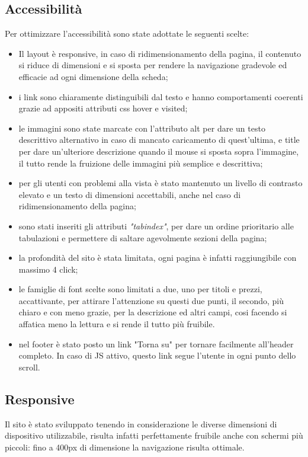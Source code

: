 \subsection{Accessibilità}
Per ottimizzare l'accessibilità sono state adottate le seguenti scelte:
\begin{itemize}
	\item Il layout è responsive, in caso di ridimensionamento della pagina, il contenuto si riduce di dimensioni e si sposta per rendere la navigazione gradevole ed efficacie ad ogni dimensione della scheda;
	\item i link sono chiaramente distinguibili dal testo e hanno comportamenti coerenti grazie ad appositi attributi css hover e visited;
	\item le immagini sono state marcate con l'attributo alt per dare un testo descrittivo alternativo in caso di mancato caricamento di quest'ultima, e title per dare un'ulteriore descrizione quando il mouse si sposta sopra l'immagine, il tutto rende la fruizione delle immagini più semplice e descrittiva;
	\item per gli utenti con problemi alla vista è stato mantenuto un livello di contrasto elevato e un testo di dimensioni accettabili, anche nel caso di ridimensionamento della pagina;
	\item sono stati inseriti gli attributi \textit{"tabindex"}, per dare un ordine prioritario alle tabulazioni e permettere di saltare agevolmente sezioni della pagina;
	\item la profondità del sito è stata limitata, ogni pagina è infatti raggiungibile con massimo 4 click;
	\item le famiglie di font scelte sono limitati a due, uno per titoli e prezzi, accattivante, per attirare l'attenzione su questi due punti, il secondo, più chiaro e con meno grazie, per la descrizione ed altri campi, cosi facendo si affatica meno la lettura e si rende il tutto più fruibile.
	\item nel footer è stato posto un link "Torna su" per tornare facilmente all'header completo. In caso di JS attivo, questo link segue l'utente in ogni punto dello scroll.
\end{itemize}
\subsection{Responsive}

Il sito è stato sviluppato tenendo in considerazione le diverse dimensioni di dispositivo utilizzabile, risulta infatti perfettamente fruibile anche con schermi più piccoli: fino a 400px di dimensione la navigazione risulta ottimale.

